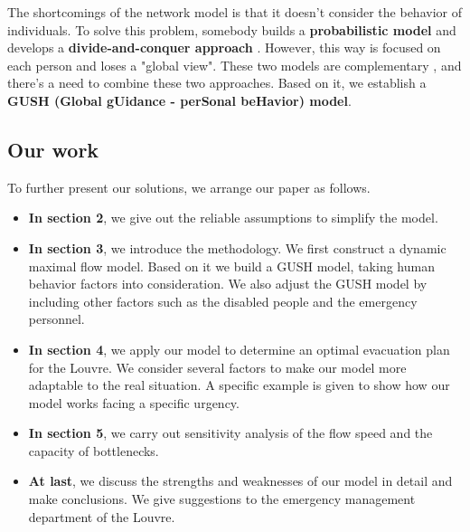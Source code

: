 \documentclass[a4paper,12pt]{article}
\begin{document}
The shortcomings of the network model is that it doesn't consider the behavior of individuals. To solve this problem, somebody builds a \textbf{probabilistic model} and develops a \textbf{divide-and-conquer approach} \citep{Wang2008Modeling}. However, this way is focused on each person and loses a "global view". These two models are complementary \citep{Chalmet1982Network}, and there's a need to combine these two approaches. Based on it, we establish a \textbf{GUSH (Global gUidance - perSonal beHavior) model}. 

\subsection{Our work}
To further present our solutions, we arrange our paper as follows.
\begin{itemize}
\item \textbf{In section 2}, we give out the reliable assumptions to simplify the model.
\item \textbf{In section 3}, we introduce the methodology. We first construct a dynamic maximal flow model. Based on it we build a GUSH model, taking human behavior factors into consideration. We also adjust the GUSH model by including other factors such as the disabled people and the emergency personnel.
\item \textbf{In section 4}, we apply our model to determine an optimal evacuation plan for the Louvre. We consider several factors to make our model more adaptable to the real situation. A specific example is given to show how our model works facing a specific urgency.
\item \textbf{In section 5}, we carry out sensitivity analysis of the flow speed and the capacity of bottlenecks.
\item \textbf{At last}, we discuss the strengths and weaknesses of our model in detail and make conclusions. We give suggestions to the emergency management department of the Louvre.
\end{itemize}
\end{document}

